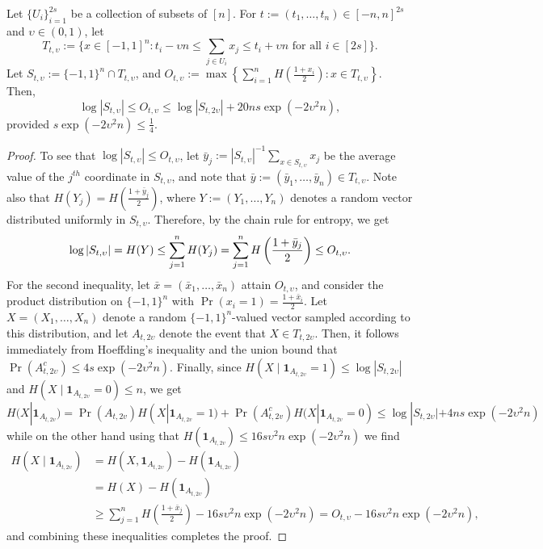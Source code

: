 \documentclass[final, 12pt]{colt2018}
\newcommand{\bone}{\boldsymbol{1}}
\theoremstyle{definition}
\theoremstyle{plain}
\begin{document}
\begin{lemma}
\label{lemma:entropyapprox}
Let $\{U_{i}\}_{i=1}^{2s}$ be a collection of subsets of $[n]$.
For $t:=(t_{1},\dots,t_{n})\in[-n,n]^{2s}$ and $\upsilon \in (0,1)$, let 
$$T_{t,\upsilon}:=\{x\in[-1,1]^{n}\colon t_{i}-\upsilon n\leq\sum_{j\in U_{i}}x_{j}\leq t_{i}+\upsilon n\text{ for all } i\in[2s]\}.$$
Let $S_{t,\upsilon}:=\{-1,1\}^{n}\cap T_{t,\upsilon}$, and $O_{t,\upsilon}:=\max\left\{\sum_{i=1}^{n}H\left(\frac{1+x_{i}}{2}\right)\colon x\in T_{t,\upsilon}\right\}$.
Then, $$\log|S_{t,\upsilon}|\leq O_{t,\upsilon}\leq\log|S_{t,2\upsilon}|+20ns\exp\left(-2\upsilon^{2}n\right),$$
provided $s\exp(-2\upsilon^{2}n)\leq\frac{1}{4}$.
\end{lemma}
\begin{proof}
To see that $\log|S_{t,\upsilon}|\leq O_{t,\upsilon}$, let $\bar{y}_{j}:=|S_{t,\upsilon}|^{-1}\sum_{x\in S_{t,\upsilon}}x_{j}$
be the average value of the $j^{th}$ coordinate in $S_{t,\upsilon}$,
and note that $\bar{y}:=(\bar{y}_{1},\dots,\bar{y}_{n})\in T_{t,\upsilon}$.
Note also that $H(Y_{j})=H\left(\frac{1+\bar{y}_{j}}{2}\right)$, where $Y:=(Y_{1},\dots,Y_{n})$
denotes a random vector distributed uniformly in $S_{t,\upsilon}$.
Therefore, by the chain rule for entropy, we get
\[
\log|S_{t,\upsilon}| =H(Y) \leq \sum_{j=1}^{n}H(Y_{j})=\sum_{j=1}^{n}H\left(\frac{1+\bar{y}_j}{2}\right)\leq O_{t,\upsilon}.\\
\]
For the second inequality, let $\bar{x}=(\bar{x}_{1},\dots,\bar{x}_{n})$
attain $O_{t,\upsilon}$, and consider the product distribution on $\{-1,1\}^{n}$
with $\Pr(x_{i}=1)=\frac{1+\bar{x}_{i}}{2}$. Let $X=(X_{1},\dots,X_{n})$ denote
a random $\{-1,1\}^{n}$-valued vector sampled according to this distribution,
and let $A_{t,2\upsilon}$ denote the event that $X\in T_{t,2\upsilon}$.
Then, it follows immediately from Hoeffding's inequality and the union
bound that $\Pr(A_{t,2\upsilon}^{c})\leq 4s\exp(-2\upsilon^{2}n)$. Finally,
since $H(X\mid\boldsymbol{1}_{A_{t,2\upsilon}}=1)\leq\log|S_{t,2\upsilon}|$
and $H(X\mid\boldsymbol{1}_{A_{t,2\upsilon}}=0)\leq n$, we get 
\[ H(X | \bone_{A_{t,2v}}) = \Pr(A_{t,2v})H(X | \bone_{A_{t,2v}} = 1) + \Pr(A_{t,2v}^c) H(X | \bone_{A_{t,2v}} = 0) \le \log|S_{t,2\upsilon}|+4ns\exp\left(-2\upsilon^{2}n\right) \]
while on the other hand using that $H(\bone_{A_{t,2v}}) \le 16s\upsilon^{2}n\exp\left(-2\upsilon^{2}n\right)$ we find
\begin{align*}
 H\left(X\mid\boldsymbol{1}_{A_{t,2\upsilon}}\right)
 & =H\left(X,\boldsymbol{1}_{A_{t,2\upsilon}}\right)-H\left(\boldsymbol{1}_{A_{t,2\upsilon}}\right) \\
 & =H(X)-H\left(\boldsymbol{1}_{A_{t,2\upsilon}}\right)\\
 & \geq\sum_{j=1}^{n}H\left(\frac{1+\bar{x}_{j}}{2}\right)-16s\upsilon^{2}n\exp\left(-2\upsilon^{2}n\right)
  =O_{t,\upsilon}-16s\upsilon^{2}n\exp\left(-2\upsilon^{2}n\right),
\end{align*}
and combining these inequalities completes the proof. 
\end{proof}
\fi
\end{document}
